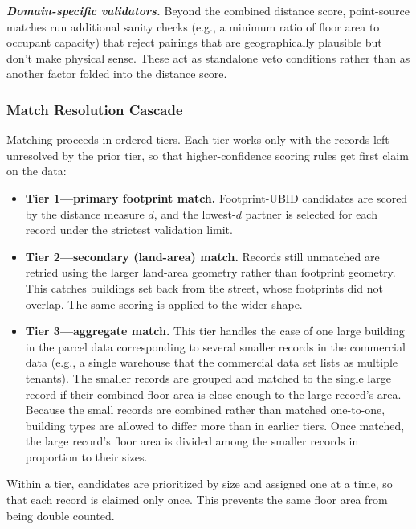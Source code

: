\textbf{\textit{Domain-specific validators.}} Beyond the combined distance score, point-source matches run additional sanity checks (e.g., a minimum ratio of floor area to occupant capacity) that reject pairings that are geographically plausible but don't make physical sense. These act as standalone veto conditions rather than as another factor folded into the distance score.

\subsubsection{Match Resolution Cascade}
\label{sec:cascade}

Matching proceeds in ordered tiers. Each tier works only with the records left unresolved by the prior tier, so that higher-confidence scoring rules get first claim on the data:

\begin{itemize}
  \item \textbf{Tier 1---primary footprint match.} Footprint-UBID candidates are scored by the distance measure $d$, and the lowest-$d$ partner is selected for each record under the strictest validation limit.

  \item \textbf{Tier 2---secondary (land-area) match.} Records still unmatched are retried using the larger land-area geometry rather than footprint geometry. This catches buildings set back from the street, whose footprints did not overlap. The same scoring is applied to the wider shape.

  \item \textbf{Tier 3---aggregate match.} This tier handles the case of one large building in the parcel data corresponding to several smaller records in the commercial data (e.g., a single warehouse that the commercial data set lists as multiple tenants). The smaller records are grouped and matched to the single large record if their combined floor area is close enough to the large record's area. Because the small records are combined rather than matched one-to-one, building types are allowed to differ more than in earlier tiers. Once matched, the large record's floor area is divided among the smaller records in proportion to their sizes.
\end{itemize}

Within a tier, candidates are prioritized by size and assigned one at a time, so that each record is claimed only once. This prevents the same floor area from being double counted.

